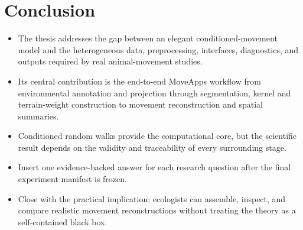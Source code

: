\chapter{Conclusion}
\label{chap:conclusion}

\begin{itemize}
  \item The thesis addresses the gap between an elegant conditioned-movement model and the heterogeneous data, preprocessing, interfaces, diagnostics, and outputs required by real animal-movement studies.
  \item Its central contribution is the end-to-end MoveApps workflow from environmental annotation and projection through segmentation, kernel and terrain-weight construction to movement reconstruction and spatial summaries.
  \item Conditioned random walks provide the computational core, but the scientific result depends on the validity and traceability of every surrounding stage.
  \item Insert one evidence-backed answer for each research question after the final experiment manifest is frozen.
  \item Close with the practical implication: ecologists can assemble, inspect, and compare realistic movement reconstructions without treating the theory as a self-contained black box.
\end{itemize}
